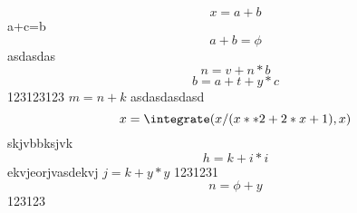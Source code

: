 $$x=a+b$$ a+c=b $$a+b=\phi$$asdasdas
$$n=v+n*b$$
\begin{equation}b=a+t+y*c\end{equation} 123123123
\(m=n+k\) asdasdasdasd
$$x=\integrate(x/(x**2+2*x+1), x)$$
skjvbbksjvk $$h=k+i*i$$ ekvjeorjvasdekvj
$j=k+y*y$
1231231$$n=\phi+y$$123123
